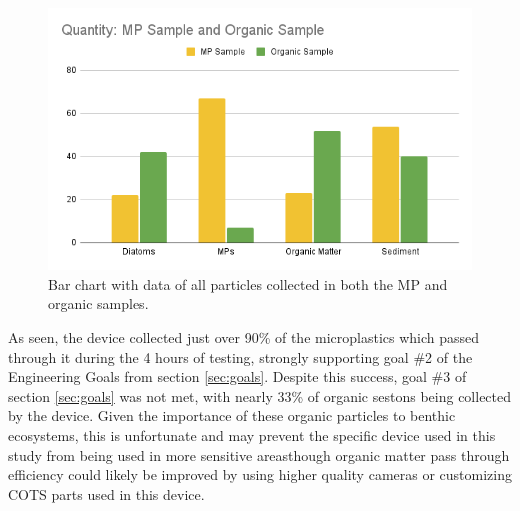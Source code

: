 \documentclass[fleqn,10pt]{SelfArx} %
\begin{document}
	\begin{figure}[H]
		\centering
		\includegraphics[width=1\linewidth]{Figures/MPOrganicCounting}
		\caption[Collected Particle Classification]{Bar chart with data of all particles collected in both the MP and organic samples.}
		\label{fig:mpcounting}
	\end{figure}
	
	As seen, the device collected just over 90\% of the microplastics which passed through it during the 4 hours of testing, strongly supporting goal \#2 of the Engineering Goals from section \ref{sec:goals}. Despite this success, goal \#3 of section \ref{sec:goals} was not met, with nearly 33\% of organic \glspl{seston} being collected by the device. Given the importance of these organic particles to \gls{benthic} ecosystems, this is unfortunate and may prevent the specific device used in this study from being used in more sensitive areas\textemdash though organic matter pass through efficiency could likely be improved by using higher quality cameras or customizing COTS parts used in this device.
	
\end{document}
